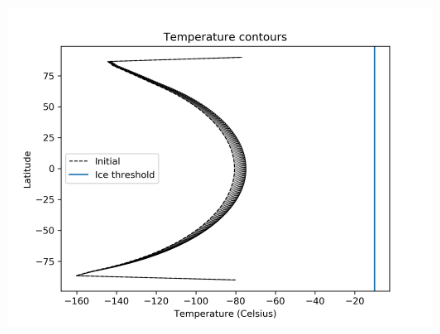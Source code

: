 \documentclass{article}
\begin{document}
\begin{figure}
\includegraphics[scale=0.4]{tcont_56.png} 
\end{figure}
\end{document}
